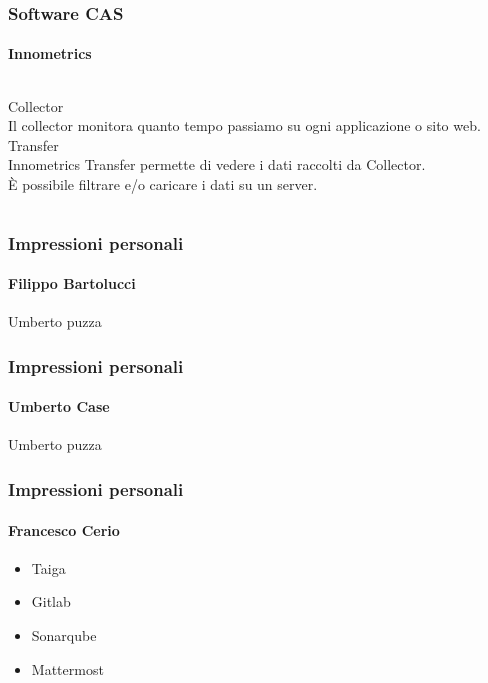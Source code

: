 \documentclass{beamer}
\begin{document}

\begin{frame}
\frametitle{Software CAS}
\framesubtitle{Innometrics}
\begin{columns}
Collector\\
Il collector monitora quanto tempo passiamo su ogni applicazione o sito web.
Transfer\\
Innometrics Transfer permette di vedere i dati raccolti da Collector.\\
È possibile filtrare e/o caricare i dati su un server.
\end{columns}
\end{frame}

\begin{frame}
\frametitle{Impressioni personali}
\framesubtitle{Filippo Bartolucci}
Umberto puzza
\end{frame}

\begin{frame}
\frametitle{Impressioni personali}
\framesubtitle{Umberto Case}
Umberto puzza
\end{frame}

\begin{frame}
\frametitle{Impressioni personali}
\framesubtitle{Francesco Cerio}
\begin{itemize}
	\item Taiga
	\item Gitlab	
	\item Sonarqube
	\item Mattermost
  \end{itemize}
\end{frame}
\end{document}
